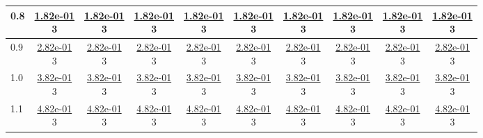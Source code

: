 \begin{table}[H]
\begin{tabular}{|l||c|c|c|c|c|c|c|c|c|}
\hline
 0.8 & \makecell{\ul{1.82e-01} \\ 3} & \makecell{\ul{1.82e-01} \\ 3} & \makecell{\ul{1.82e-01} \\ 3} & \makecell{\ul{1.82e-01} \\ 3} & \makecell{\ul{1.82e-01} \\ 3} & \makecell{\ul{1.82e-01} \\ 3} & \makecell{\ul{1.82e-01} \\ 3} & \makecell{\ul{1.82e-01} \\ 3} & \makecell{\ul{1.82e-01} \\ 3} \\
\hline
 0.9 & \makecell{\ul{2.82e-01} \\ 3} & \makecell{\ul{2.82e-01} \\ 3} & \makecell{\ul{2.82e-01} \\ 3} & \makecell{\ul{2.82e-01} \\ 3} & \makecell{\ul{2.82e-01} \\ 3} & \makecell{\ul{2.82e-01} \\ 3} & \makecell{\ul{2.82e-01} \\ 3} & \makecell{\ul{2.82e-01} \\ 3} & \makecell{\ul{2.82e-01} \\ 3} \\
\hline
 1.0 & \makecell{\ul{3.82e-01} \\ 3} & \makecell{\ul{3.82e-01} \\ 3} & \makecell{\ul{3.82e-01} \\ 3} & \makecell{\ul{3.82e-01} \\ 3} & \makecell{\ul{3.82e-01} \\ 3} & \makecell{\ul{3.82e-01} \\ 3} & \makecell{\ul{3.82e-01} \\ 3} & \makecell{\ul{3.82e-01} \\ 3} & \makecell{\ul{3.82e-01} \\ 3} \\
\hline
 1.1 & \makecell{\ul{4.82e-01} \\ 3} & \makecell{\ul{4.82e-01} \\ 3} & \makecell{\ul{4.82e-01} \\ 3} & \makecell{\ul{4.82e-01} \\ 3} & \makecell{\ul{4.82e-01} \\ 3} & \makecell{\ul{4.82e-01} \\ 3} & \makecell{\ul{4.82e-01} \\ 3} & \makecell{\ul{4.82e-01} \\ 3} & \makecell{\ul{4.82e-01} \\ 3} \\

\end{tabular}
\end{table}
